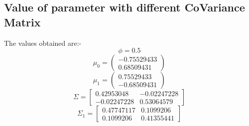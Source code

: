 \documentclass[12pt]{article}
\begin{document}
\subsection{Value of parameter with different CoVariance Matrix} The values obtained are:-
\begin{equation}
    \phi=0.5
\end{equation}
\begin{equation}
    \mu_{0} =
    \begin{pmatrix}
        -0.75529433\\
        0.68509431
    \end{pmatrix}
\end{equation}
\begin{equation}
    \mu_{1} =
    \begin{pmatrix}
        0.75529433\\
        -0.68509431
    \end{pmatrix}
\end{equation}
\begin{equation}
    \Sigma=\left[\begin{array}{cc}
        0.42953048 & -0.02247228 \\
        -0.02247228 & 0.53064579
    \end{array}\right]
\end{equation}
$$
\Sigma_{1}=\left[\begin{array}{cc}
0.47747117 & 0.1099206 \\
0.1099206 & 0.41355441
\end{array}\right]
$$
\end{document}
